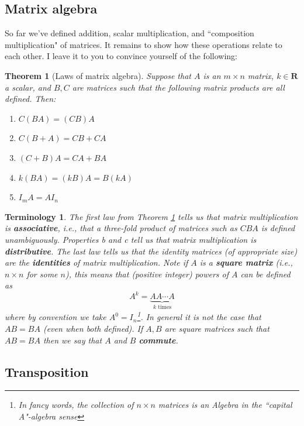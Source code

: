 \documentclass[12pt]{article}
\numberwithin{equation}{subsection}
\numberwithin{figure}{subsection}
\newtheorem{thm}[subsection]{Theorem}
\theoremstyle{note}
\newtheorem{terminology}[subsection]{Terminology}
\begin{document}
\subsection{Matrix algebra}		
	So far we've defined addition, scalar multiplication, and ``composition multiplication" of matrices. It remains to show how these operations relate to each other. I leave it to you to convince yourself of the following: 
	\begin{thm}[Laws of matrix algebra] \label{thm-mat-alg}
	Suppose that $A$ is an $m\times n$ matrix, $k\in\mathbf{R}$ a scalar, and $B,C$ are matrices such that the following matrix products are all defined. Then:
	\begin{enumerate}
		\item $C(BA)=(CB)A$ 
		\item $C(B+A)=CB+CA$
		\item $(C+B)A=CA+BA$
		\item $k(BA)=(kB)A=B(kA)$
		\item $I_mA=AI_n$
	\end{enumerate}
	\end{thm}
	\begin{terminology} The first law from Theorem \ref{thm-mat-alg} tells us that matrix multiplication is \textbf{associative}, i.e., that a three-fold product of matrices such as  $CBA$ is defined unambiguously. Properties b and c tell us that matrix multiplication is \textbf{distributive}. The last law tells us that the identity matrices (of appropriate size) are the \textbf{identities} of matrix multiplication. Note if $A$ is a \textbf{square matrix} (i.e., $n\times n$ for some $n$), this means that (positive integer) powers of $A$ can be defined as \begin{equation} A^k=\underbrace{AA\cdots A}_{\text{$k$ times}}\end{equation} where by convention we take $A^0=I_n$\footnote{In fancy words, the collection of $n\times n$ matrices is an \textit{Algebra} in the ``capital A"-algebra sense}. In general it is not the case that $AB=BA$ (even when both defined). If $A,B$ are square matrices such that $AB=BA$ then we say that $A$ and $B$ \textbf{commute}.
	\end{terminology}
\subsection{Transposition}
\end{document}
